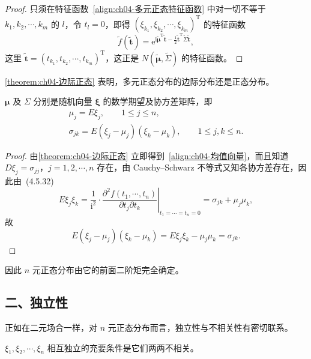 \documentclass[../../main.tex]{subfiles}
\begin{document}
\begin{proof}
只须在特征函数~\eqref{align:ch04-多元正态特征函数} 中对一切不等于 $k_1,k_2,\cdots,k_m$ 的 $l$，令 $t_l=0$，即得 $(\xi_{k_1},\xi_{k_2},\cdots,\xi_{k_m})^{\mathrm{T}}$ 的特征函数
\[
\tilde{f}(\tilde{\boldsymbol{t}})=\mathrm{e}^{\mathrm{i}\tilde{\boldsymbol{\mu}}^{\mathrm{T}}\tilde{\boldsymbol{t}}-\frac12\tilde{\boldsymbol{t}}^{\mathrm{T}}\tilde{\Sigma}\tilde{\boldsymbol{t}}},
\]
这里 $\tilde{\boldsymbol{t}}=(t_{k_1},t_{k_2},\cdots,t_{k_m})^{\mathrm{T}}$，这正是 $N(\tilde{\boldsymbol{\mu}},\tilde{\Sigma})$ 的特征函数。
\end{proof}

\cref{theorem:ch04-边际正态} 表明，多元正态分布的边际分布还是正态分布。

\begin{theorem}[数字特征]\label{theorem:ch04-多元正态数字特征}
$\boldsymbol{\mu}$ 及 $\Sigma$ 分别是随机向量 $\boldsymbol{\xi}$ 的数学期望及协方差矩阵，即
\begin{align}
\mu_j=E\xi_j,\qquad 1\leqslant j\leqslant n,\label{align:ch04-均值向量}\\
\sigma_{jk}=E(\xi_j-\mu_j)(\xi_k-\mu_k),\qquad 1\leqslant j,k\leqslant n.\label{align:ch04-协方差元素}
\end{align}
\end{theorem}

\begin{proof}
由\cref{theorem:ch04-边际正态} 立即得到~\eqref{align:ch04-均值向量}，而且知道 $D\xi_j=\sigma_{jj}$，$j=1,2,\cdots,n$ 存在，由 Cauchy--Schwarz 不等式又知各协方差存在，因此由~(4.5.32)
\[
E\xi_j\xi_k=\frac{1}{\mathrm{i}^2}\cdot\left.\frac{\partial^2 f(t_1,\cdots,t_n)}{\partial t_j\partial t_k}\right|_{t_1=\cdots=t_n=0}=\sigma_{jk}+\mu_j\mu_k,
\]
故
\[
E(\xi_j-\mu_j)(\xi_k-\mu_k)=E\xi_j\xi_k-\mu_j\mu_k=\sigma_{jk}.
\]
\end{proof}

因此 $n$ 元正态分布由它的前面二阶矩完全确定。

\subsection*{二、独立性}

正如在二元场合一样，对 $n$ 元正态分布而言，独立性与不相关性有密切联系。

\begin{theorem}[不相关即独立]\label{theorem:ch04-正态不相关即独立}
$\xi_1,\xi_2,\cdots,\xi_n$ 相互独立的充要条件是它们两两不相关。
\end{theorem}
\end{document}
